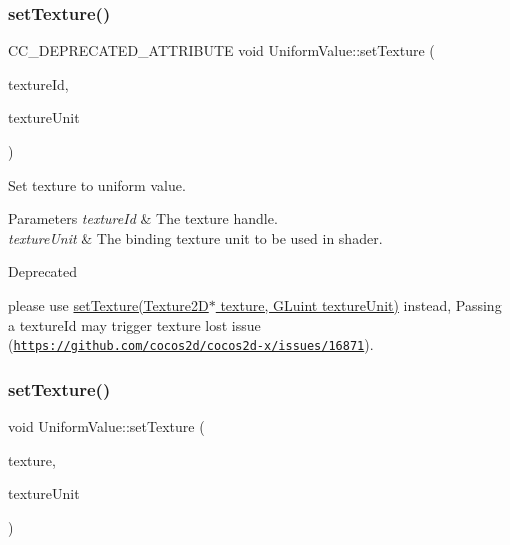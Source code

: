 \subsubsection{\texorpdfstring{set\+Texture()}{setTexture()}\hspace{0.1cm}{\footnotesize\ttfamily [2/3]}}
{\footnotesize\ttfamily C\+C\+\_\+\+D\+E\+P\+R\+E\+C\+A\+T\+E\+D\+\_\+\+A\+T\+T\+R\+I\+B\+U\+TE void Uniform\+Value\+::set\+Texture (\begin{DoxyParamCaption}\item[{G\+Luint}]{texture\+Id,  }\item[{G\+Luint}]{texture\+Unit }\end{DoxyParamCaption})}

Set texture to uniform value. 
\begin{DoxyParams}{Parameters}
{\em texture\+Id} & The texture handle. \\
\hline
{\em texture\+Unit} & The binding texture unit to be used in shader. \\
\hline
\end{DoxyParams}
\begin{DoxyRefDesc}{Deprecated}
\item[\hyperlink{deprecated__deprecated000365}{Deprecated}]please use \hyperlink{classUniformValue_ad55812685ddc1cc858ada0cf5fe2afaf}{set\+Texture(\+Texture2\+D$\ast$ texture, G\+Luint texture\+Unit)} instead, Passing a {\ttfamily texture\+Id} may trigger texture lost issue (\href{https://github.com/cocos2d/cocos2d-x/issues/16871}{\tt https\+://github.\+com/cocos2d/cocos2d-\/x/issues/16871}). \end{DoxyRefDesc}
\mbox{\label{classUniformValue_ad55812685ddc1cc858ada0cf5fe2afaf}} 
\subsubsection{\texorpdfstring{set\+Texture()}{setTexture()}\hspace{0.1cm}{\footnotesize\ttfamily [3/3]}}
{\footnotesize\ttfamily void Uniform\+Value\+::set\+Texture (\begin{DoxyParamCaption}\item[{\hyperlink{classTexture2D}{Texture2D} $\ast$}]{texture,  }\item[{G\+Luint}]{texture\+Unit }\end{DoxyParamCaption})}

